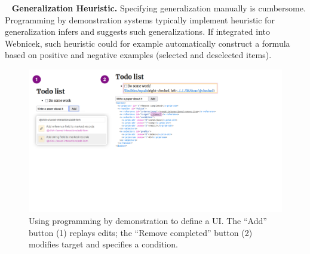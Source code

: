 \documentclass[sigconf,anonymous,screen]{acmart}
\newcommand{\note}[1]{\textcolor{red}{#1}}
\DeclareRobustCommand{\keyideabox}[3]{\begin{tcolorbox}[breakable,
  boxsep=5pt,left=0pt,right=0pt,top=0pt,bottom=0pt,width=\dimexpr\columnwidth\relax,
  colback=gray!20,colframe=gray!20,
  enlarge bottom by=0pt,enlarge top by=0pt,
  arc=0pt,outer arc=0pt]
\lettrine[lraise=0.3]{\LARGE #1}{~}
\small \textbf{#2.} #3
\end{tcolorbox}
}
\begin{document}
%

\keyideabox{\faMagic}{Generalization Heuristic}{Specifying generalization manually is cumbersome.
Programming by demonstration systems typically implement heuristic for generalization
\cite{myers-2000-intelligence} infers and suggests such generalizations. If integrated into
Webnicek, such heuristic could for example automatically construct a formula
based on positive and negative examples \cite{gulwani-2014-flash} (selected and deselected items).}


\begin{figure}[t]
\vspace{-0.5em}
\includegraphics[width=1\columnwidth,clip,trim=0.5cm 8.5cm 8.5cm 0.5cm]{fig/interactive.pdf}
\vspace{-1.25em}
\caption{Using programming by demonstration to define a UI. The ``Add'' button (1) replays edits;
the ``Remove completed'' button (2) modifies target and specifies a condition. }
\label{fig:interactive}
\vspace{-1em}
\end{figure}
\end{document}
